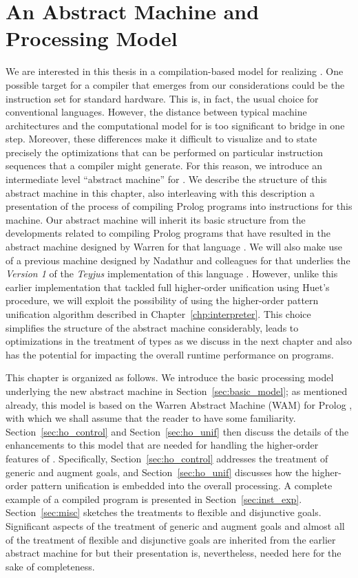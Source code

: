 \chapter{An Abstract Machine and Processing Model}\label{chp:compile}
We are interested in this thesis in a compilation-based model for
realizing . One possible target for a compiler that emerges from
our considerations could be the instruction set for standard
hardware. This is, in fact, the usual choice for conventional
languages. However, the distance between typical machine architectures
and the computational model for  is too significant to bridge in
one step. Moreover, these differences make it difficult to visualize
and to state precisely the optimizations that can be performed on
particular instruction sequences that a compiler might generate. For
this reason, we introduce an intermediate level ``abstract machine''
for . We describe the structure of this abstract machine in this
chapter, also interleaving with this description a presentation of the
process of compiling Prolog programs into instructions for
this machine. Our abstract machine will inherit its basic structure
from the developments related to compiling Prolog programs that have
resulted in the abstract machine designed by Warren for that language
\cite{Warren83WAM}. We will also make use of a previous machine
designed by Nadathur and colleagues for  \cite{KNW94cl,
  N03treatment, NJK95lp} that underlies the {\em Version 1} of the {\em Teyjus}
implementation of this language \cite{NM99cade}. However, unlike this
earlier implementation that tackled full higher-order unification
using Huet's procedure, we will exploit the possibility of using the
higher-order pattern unification algorithm described in
Chapter~\ref{chp:interpreter}.  This
choice simplifies the structure of the abstract machine considerably,
leads to optimizations in the treatment of types as we discuss in the
next chapter and also has the potential for impacting the overall
runtime performance on  programs.

This chapter is organized as follows. We introduce the basic
processing model underlying the new abstract machine in
Section~\ref{sec:basic_model}; as mentioned already, this model is
based on the Warren Abstract Machine (WAM) for Prolog
\cite{Warren83WAM}, with which we shall assume that the reader to have
some familiarity.
Section~\ref{sec:ho_control} and Section~\ref{sec:ho_unif}
then discuss the details of the enhancements to this model that are
needed for handling the higher-order features of .
Specifically, Section~\ref{sec:ho_control} addresses the treatment
of generic and augment goals, and Section~\ref{sec:ho_unif}
discusses how the higher-order pattern unification is embedded
into the overall processing.
A complete example of a compiled  program is presented in
Section~\ref{sec:inst_exp}.
Section~\ref{sec:misc} sketches the treatments to flexible and disjunctive
goals. Significant aspects of the treatment of generic and augment
goals and almost all of the treatment of flexible and disjunctive
goals are inherited from the earlier abstract machine for  but
their presentation is, nevertheless, needed here for the sake of
completeness.

